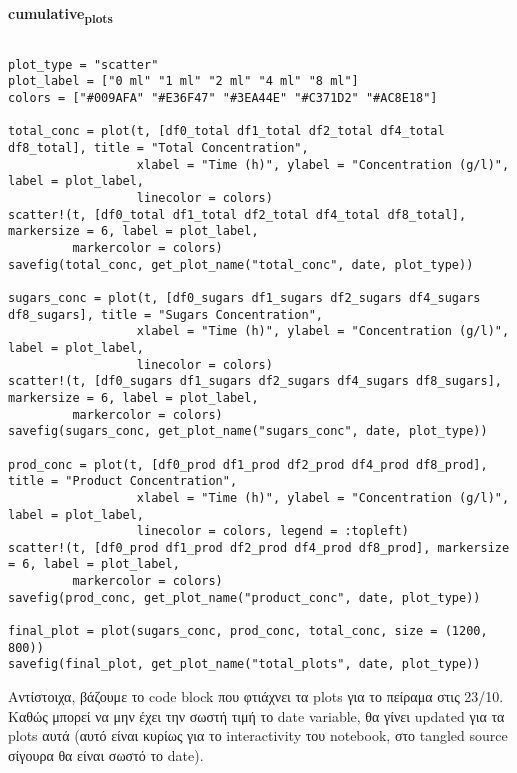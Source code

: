 \documentclass[11pt]{article}
\begin{document}
\textbf{cumulative\textsubscript{plots}}
\begin{verbatim}

plot_type = "scatter"
plot_label = ["0 ml" "1 ml" "2 ml" "4 ml" "8 ml"]
colors = ["#009AFA" "#E36F47" "#3EA44E" "#C371D2" "#AC8E18"]

total_conc = plot(t, [df0_total df1_total df2_total df4_total df8_total], title = "Total Concentration",
                  xlabel = "Time (h)", ylabel = "Concentration (g/l)", label = plot_label,
                  linecolor = colors)
scatter!(t, [df0_total df1_total df2_total df4_total df8_total], markersize = 6, label = plot_label,
         markercolor = colors)
savefig(total_conc, get_plot_name("total_conc", date, plot_type))

sugars_conc = plot(t, [df0_sugars df1_sugars df2_sugars df4_sugars df8_sugars], title = "Sugars Concentration",
                  xlabel = "Time (h)", ylabel = "Concentration (g/l)", label = plot_label,
                  linecolor = colors)
scatter!(t, [df0_sugars df1_sugars df2_sugars df4_sugars df8_sugars], markersize = 6, label = plot_label,
         markercolor = colors)
savefig(sugars_conc, get_plot_name("sugars_conc", date, plot_type))

prod_conc = plot(t, [df0_prod df1_prod df2_prod df4_prod df8_prod], title = "Product Concentration",
                  xlabel = "Time (h)", ylabel = "Concentration (g/l)", label = plot_label,
                  linecolor = colors, legend = :topleft)
scatter!(t, [df0_prod df1_prod df2_prod df4_prod df8_prod], markersize = 6, label = plot_label,
         markercolor = colors)
savefig(prod_conc, get_plot_name("product_conc", date, plot_type))

final_plot = plot(sugars_conc, prod_conc, total_conc, size = (1200, 800))
savefig(final_plot, get_plot_name("total_plots", date, plot_type))

\end{verbatim}

Αντίστοιχα, βάζουμε το code block που φτιάχνει τα plots για το πείραμα στις 23/10. Καθώς μπορεί να μην έχει την σωστή τιμή το date variable, θα γίνει updated για τα plots αυτά (αυτό είναι κυρίως για το interactivity του notebook, στο tangled source σίγουρα θα είναι σωστό το date).
\end{document}
